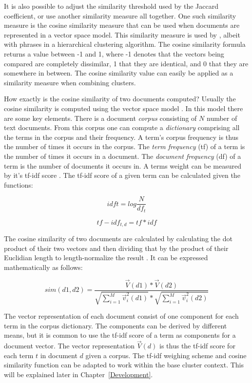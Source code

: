 It is also possible to adjust the similarity threshold used by the Jaccard coefficient, or use another similarity measure all together. One such similarity measure is the cosine similarity measure that can be used when documents are represented in a vector space model. This similarity measure is used by \cite{Chim2007}, albeit with phrases in a hierarchical clustering algorithm. The cosine similarity formula returns a value between -1 and 1, where -1 denotes that the vectors being compared are completely dissimilar, 1 that they are identical, and 0 that they are somewhere in between. The cosine similarity value can easily be applied as a similarity measure when combining clusters.

How exactly is the cosine similarity of two documents computed? Usually the cosine similarity is computed using the vector space model \cite{Manning2009a}. In this model there are some key elements. There is a document \textit{corpus} consisting of \(N\) number of text documents. From this corpus one can compute a \textit{dictionary} comprising all the terms in the corpus and their frequency. A term's corpus frequency is thus the number of times it occurs in the corpus. The \textit{term frequency} (tf) of a term is the number of times it occurs in a document. The \textit{document frequency} (df) of a term is the number of documents it occurs in. A terms weight can be measured by it's tf-idf score \cite{Manning2009a}. The tf-idf score of a given term can be calculated given the functions:


\begin{displaymath}
idf{t} = log \frac{N}{df_{t}} 
\end{displaymath}

\begin{displaymath}
tf-idf_{t,d} = tf * idf
\end{displaymath}

The cosine similarity of two documents are calculated by calculating the dot product of their two vectors and then dividing that by the product of their Euclidian length to length-normalize the result \cite{Manning2009a}. It can be expressed mathematically as follows:

\begin{displaymath}
sim(d1, d2) = \frac{\vec{V}(d1) * \vec{V}(d2)}
{\sqrt{\sum_{i = 1}^M\vec{v}_{i}^2(d1)} * \sqrt{\sum_{i = 1}^M\vec{v}_{i}^2(d2)}}
\end{displaymath}

The vector representation of each document consist of one component for each term in the corpus dictionary. The components can be derived by different means, but it is common to use the tf-idf score of a term as components for a document vector. The vector representation \(\vec{V}(d)\) is thus the tf-idf score for each term \(t\) in document \(d\) given a corpus. The tf-idf weighing scheme and cosine similarity function can be adapted to work within the base cluster context. This will be explained later in Chapter~\ref{Development}.

